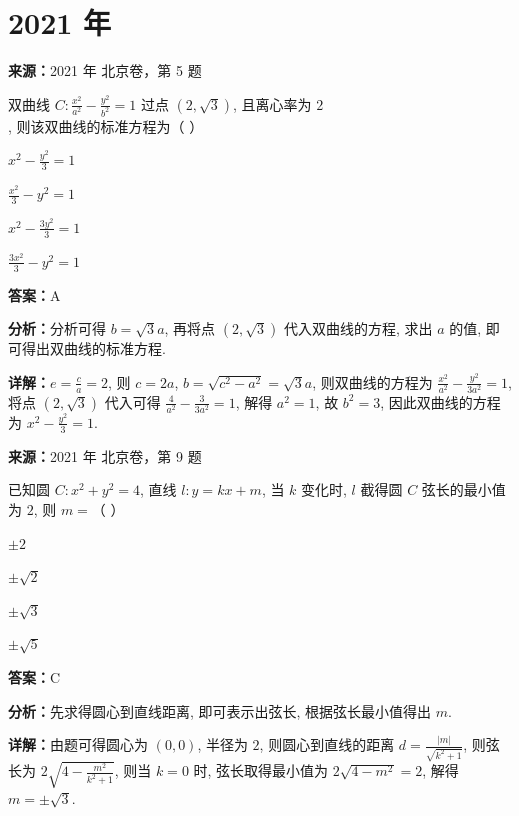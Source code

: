 \section*{2021 年}

\begin{question}[points=4]
\textbf{来源：}2021 年 北京卷，第 5 题\par
双曲线 $C:\frac{x^2}{a^2}-\frac{y^2}{b^2}=1$ 过点 $(2,\sqrt{3})$, 且离心率为 $2$, 则该双曲线的标准方程为（ ）
\begin{choices}
  \item $x^2-\frac{y^2}{3}=1$
  \item $\frac{x^2}{3}-y^2=1$
  \item $x^2-\frac{3y^2}{3}=1$
  \item $\frac{3x^2}{3}-y^2=1$
\end{choices}
\begin{solution}
\textbf{答案：}A

\textbf{分析：}分析可得 $b=\sqrt{3}a$, 再将点 $(2,\sqrt{3})$ 代入双曲线的方程, 求出 $a$ 的值, 即可得出双曲线的标准方程.

\textbf{详解：}$e=\frac{c}{a}=2$, 则 $c=2a$, $b=\sqrt{c^2-a^2}=\sqrt{3}a$, 则双曲线的方程为 $\frac{x^2}{a^2}-\frac{y^2}{3a^2}=1$, 将点 $(2,\sqrt{3})$ 代入可得 $\frac{4}{a^2}-\frac{3}{3a^2}=1$, 解得 $a^2=1$, 故 $b^2=3$, 因此双曲线的方程为 $x^2-\frac{y^2}{3}=1$.
\end{solution}
\end{question}

\begin{question}[points=4]
\textbf{来源：}2021 年 北京卷，第 9 题\par
已知圆 $C:x^2+y^2=4$, 直线 $l:y=kx+m$, 当 $k$ 变化时, $l$ 截得圆 $C$ 弦长的最小值为 $2$, 则 $m=$（ ）
\begin{choices}
  \item $\pm 2$
  \item $\pm \sqrt{2}$
  \item $\pm \sqrt{3}$
  \item $\pm \sqrt{5}$
\end{choices}
\begin{solution}
\textbf{答案：}C

\textbf{分析：}先求得圆心到直线距离, 即可表示出弦长, 根据弦长最小值得出 $m$.

\textbf{详解：}由题可得圆心为 $(0,0)$, 半径为 $2$, 则圆心到直线的距离 $d=\frac{|m|}{\sqrt{k^2+1}}$, 则弦长为 $2\sqrt{4-\frac{m^2}{k^2+1}}$, 则当 $k=0$ 时, 弦长取得最小值为 $2\sqrt{4-m^2}=2$, 解得 $m=\pm\sqrt{3}$.
\end{solution}
\end{question}

